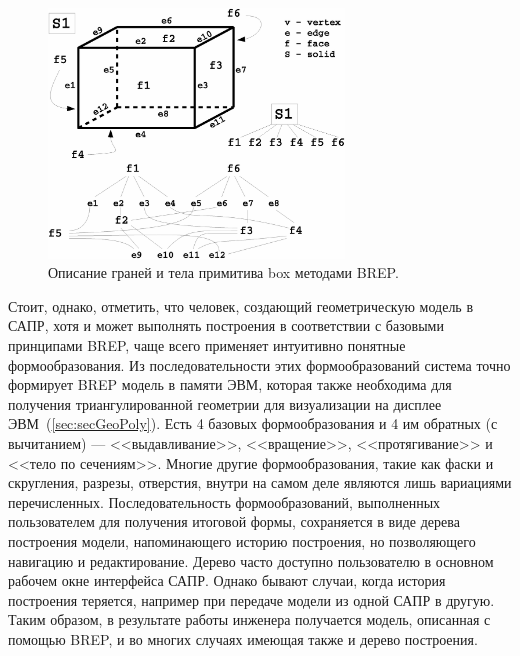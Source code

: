 \begin{figure}[H]
\centering
\includegraphics[width=0.7\textwidth]{pictures/BREPbox2.eps}
\caption{Описание граней и тела примитива box методами BREP.}
\label{fig:BREPbox2}
\end{figure}


Стоит, однако, отметить, что человек, создающий геометрическую модель в САПР, хотя и может выполнять построения в соответствии с базовыми принципами BREP, чаще всего применяет интуитивно понятные формообразования. Из последовательности этих формообразований система точно формирует BREP модель в памяти ЭВМ, которая также необходима для получения триангулированной геометрии для визуализации на дисплее ЭВМ~(\ref{sec:secGeoPoly}). Есть 4 базовых формообразования и 4 им обратных (с вычитанием) --- <<выдавливание>>, <<вращение>>, <<протягивание>> и <<тело по сечениям>>. Многие другие формообразования, такие как фаски и скругления, разрезы, отверстия, внутри на самом деле являются лишь вариациями перечисленных. Последовательность формообразований, выполненных пользователем для получения итоговой формы, сохраняется в виде дерева построения модели, напоминающего историю построения, но позволяющего навигацию и редактирование. Дерево часто доступно пользователю в основном рабочем окне интерфейса САПР. Однако бывают случаи, когда история построения теряется, например при передаче модели из одной САПР в другую. Таким образом, в результате работы инженера получается модель, описанная с помощью BREP, и во многих случаях имеющая также и дерево построения.


